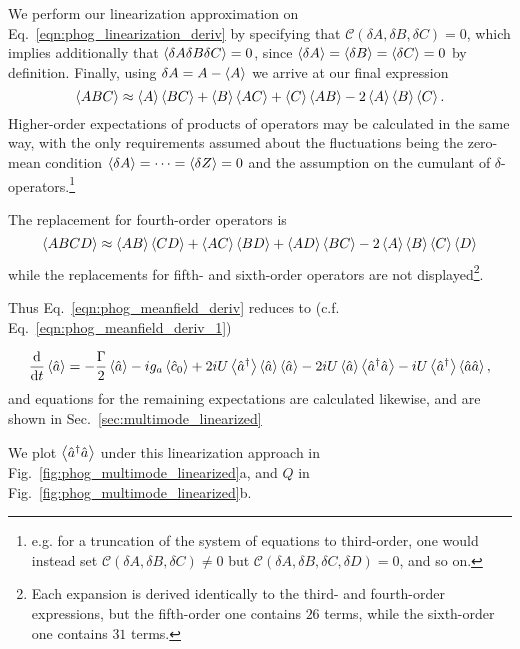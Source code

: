 \noindent We perform our linearization approximation on Eq.~\ref{eqn:phog_linearization_deriv} by specifying that $\mathcal{C}\left(\delta A, \delta B, \delta C \right) = 0$, which implies additionally that $\ev{\delta A \delta B \delta C} = 0$, since $\ev{\delta A} = \ev{\delta B} = \ev{\delta C} = 0$ by definition. Finally, using $\delta A = A - \ev{A}$ we arrive at our final expression
\begin{equation}\label{eqn:linearization_3}
\ev{A B C} \approx \ev{A} \ev{B C} + \ev{B} \ev{A C} + \ev{C} \ev{A B} - 2 \ev{A} \ev{B} \ev{C}.
\end{equation}
Higher-order expectations of products of operators may be calculated in the same way, with the only requirements assumed about the fluctuations being the zero-mean condition $\ev{\delta A} = \dots = \ev{\delta Z} = 0$ and the assumption on the cumulant of $\delta$-operators.\footnote{e.g. for a truncation of the system of equations to third-order, one would instead set $\mathcal{C}\left(\delta A, \delta B, \delta C\right) \ne 0$ but $\mathcal{C}\left(\delta A, \delta B, \delta C , \delta D\right) = 0$, and so on.}

The replacement for fourth-order operators is
\begin{equation}
\ev{A B C D} \approx \ev{A B}\ev{C D} + \ev{A C}\ev{B D} + \ev{A D}\ev{B C} - 2 \ev{A}\ev{B}\ev{C}\ev{D}
\end{equation}
while the replacements for fifth- and sixth-order operators are not displayed\footnote{Each expansion is derived identically to the third- and fourth-order expressions, but the fifth-order one contains $26$ terms, while the sixth-order one contains $31$ terms.}. 

Thus Eq.~\ref{eqn:phog_meanfield_deriv} reduces to (c.f. Eq.~\ref{eqn:phog_meanfield_deriv_1})

\begin{equation}
\ddt \ev{\hat{a}} = - \frac{\Gamma}{2} \ev{\hat{a}} - i g_a \ev{\hat{c}_0} + 2 i U \ev{\hat{a}^\dagger}\ev{\hat{a}}\ev{\hat{a}} - 2 i U \ev{\hat{a}}\ev{\hat{a}^\dagger \hat{a}} - i U \ev{\hat{a}^\dagger} \ev{\hat{a} \hat{a}},
\end{equation}
and equations for the remaining expectations are calculated likewise, and are shown in Sec.~\ref{sec:multimode_linearized}


We plot $\ev{\hat{a}^\dagger \hat{a}}$ under this linearization approach in Fig.~\ref{fig:phog_multimode_linearized}a, and $Q$ in Fig.~\ref{fig:phog_multimode_linearized}b. 

